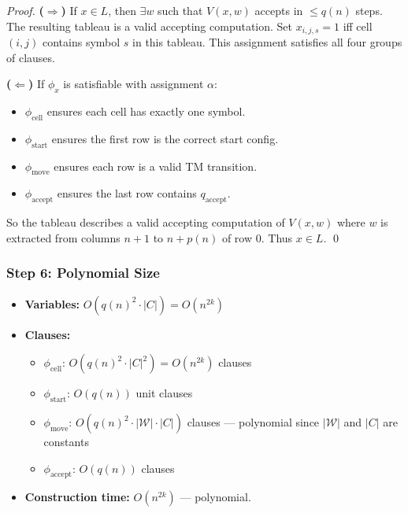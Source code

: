 \documentclass[12pt,a4paper]{article}
\begin{document}
\begin{proof}
\textbf{($\Rightarrow$)} If $x \in L$, then $\exists w$ such that $V(x,w)$ accepts in $\leq q(n)$ steps.
The resulting tableau is a valid accepting computation. Set $x_{i,j,s} = 1$ iff cell $(i,j)$ 
contains symbol $s$ in this tableau. This assignment satisfies all four groups of clauses.

\medskip
\noindent\textbf{($\Leftarrow$)} If $\phi_x$ is satisfiable with assignment $\alpha$:
\begin{itemize}[leftmargin=2em]
  \item $\phi_{\text{cell}}$ ensures each cell has exactly one symbol.
  \item $\phi_{\text{start}}$ ensures the first row is the correct start config.
  \item $\phi_{\text{move}}$ ensures each row is a valid TM transition.
  \item $\phi_{\text{accept}}$ ensures the last row contains $q_\mathrm{accept}$.
\end{itemize}
So the tableau describes a valid accepting computation of $V(x, w)$ where 
$w$ is extracted from columns $n+1$ to $n+p(n)$ of row 0. Thus $x \in L$. \qed
\end{proof}

\subsubsection{Step 6: Polynomial Size}

\begin{itemize}[leftmargin=2em]
  \item \textbf{Variables:} $O(q(n)^2 \cdot |C|) = O(n^{2k})$
  \item \textbf{Clauses:} 
    \begin{itemize}
      \item $\phi_{\text{cell}}$: $O(q(n)^2 \cdot |C|^2) = O(n^{2k})$ clauses
      \item $\phi_{\text{start}}$: $O(q(n))$ unit clauses
      \item $\phi_{\text{move}}$: $O(q(n)^2 \cdot |\mathcal{W}| \cdot |C|)$ clauses --- polynomial since $|\mathcal{W}|$ and $|C|$ are constants
      \item $\phi_{\text{accept}}$: $O(q(n))$ clauses
    \end{itemize}
  \item \textbf{Construction time:} $O(n^{2k})$ --- polynomial.
\end{itemize}
\end{document}
